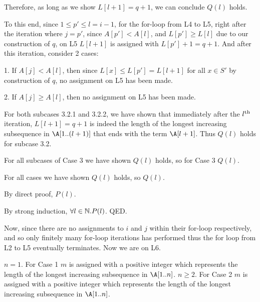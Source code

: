 \documentclass[11pt, sakura, night, 1in]{hw}
\begin{document}
{{{{\begin{proofcases}
{{                            Therefore, as long as we show $L[l+1]=q+1$, we can conclude $Q(l)$ holds.

                            To this end, since $1\le p'\le l=i-1$, for the for-loop from L4 to L5, right after the iteration where $j=p'$, since $A[p']<A[l]$, and $L[p']\ge L[l]$ due to our construction of $q$, on L5 $L[l+1]$ is assigned with $L[p']+1=q+1$. And after this iteration, consider 2 cases:

                            1. If $A[j]<A[l]$, then since $L[x]\le L[p']=L[l+1]$ for all $x\in S'$ by construction of $q$, no assignment on L5 has been made.

                            2. If $A[j]\ge A[l]$, then no assignment on L5 has been made.

                            For both subcases 3.2.1 and 3.2.2, we have shown that immediately after the $l^{\text{th}}$ iteration, $L[l+1]=q+1$ is indeed the length of the longest increasing subsequence in $\A[1..(l+1)]$ that ends with the term $\A[l+1]$. Thus $Q(l)$ holds for subcase 3.2.
                        }
                    }

                    For all subcases of Case 3 we have shown $Q(l)$ holds, so for Case 3 $Q(l)$.
                \end{proofcases}

                For all cases we have shown $Q(l)$ holds, so $Q(l)$.
            }

            By direct proof, $P(l)$.
        }
    }

    By strong induction, $\forall l\in\mathbb{N}. P(l)$. QED.

    Now, since there are no assignments to $i$ and $j$ within their for-loop respectively, and so only finitely many for-loop iterations has performed thus the for loop from L2 to L5 eventually terminates. Now we are on L6.
    
    \begin{proofcases}
        \case $n=1$.
        For Case 1 $m$ is assigned with a positive integer which represents the length of the longest increasing subsequence in $\A[1..n]$.
        \case $n\ge2$.
        For Case 2 $m$ is assigned with a positive integer which represents the length of the longest increasing subsequence in $\A[1..n]$.
    \end{proofcases}

}
\end{document}
